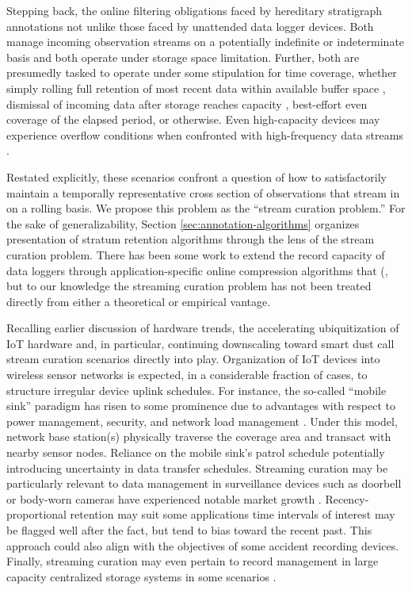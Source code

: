 Stepping back, the online filtering obligations faced by hereditary stratigraph annotations not unlike those faced by unattended data logger devices.
Both manage incoming observation streams on a potentially indefinite or indeterminate basis and both operate under storage space limitation.
Further, both are presumedly tasked to operate under some stipulation for time coverage, whether simply rolling full retention of most recent data within available buffer space \citep{fincham1995use}, dismissal of incoming data after storage reaches capacity \citep{saunders1989portable,mahzan2017design}, best-effort even coverage of the elapsed period, or otherwise.
Even high-capacity devices may experience overflow conditions when confronted with high-frequency data streams \citep{luharuka2003design}.

Restated explicitly, these scenarios confront a question of how to satisfactorily maintain a temporally representative cross section of observations that stream in on a rolling basis.
We propose this problem as the ``stream curation problem.''
For the sake of generalizability, Section \ref{sec:annotation-algorithms} organizes presentation of stratum retention algorithms through the lens of the stream curation problem.
There has been some work to extend the record capacity of data loggers through application-specific online compression algorithms that (\citep{hadiatna2016design}, but to our knowledge the streaming curation problem has not been treated directly from either a theoretical or empirical vantage.

Recalling earlier discussion of hardware trends, the accelerating ubiquitization of IoT hardware and, in particular, continuing downscaling toward smart dust call stream curation scenarios directly into play.
Organization of IoT devices into wireless sensor networks is expected, in a considerable fraction of cases, to structure irregular device uplink schedules.
For instance, the so-called ``mobile sink'' paradigm has risen to some prominence due to advantages with respect to power management, security, and network load management \citep{jain2022survey}.
Under this model, network base station(s) physically traverse the coverage area and transact with nearby sensor nodes.
Reliance on the mobile sink's patrol schedule potentially introducing uncertainty in data transfer schedules.
Streaming curation may be particularly relevant to data management in surveillance devices such as doorbell or body-worn cameras have experienced notable market growth \citep{calacci2022cop,lum2019research}.
Recency-proportional retention may suit some applications time intervals of interest may be flagged well after the fact, but tend to bias toward the recent past.
This approach could also align with the objectives of some accident recording devices.
Finally, streaming curation may even pertain to record management in large capacity centralized storage systems in some scenarios \citep{bhat2018data}.

